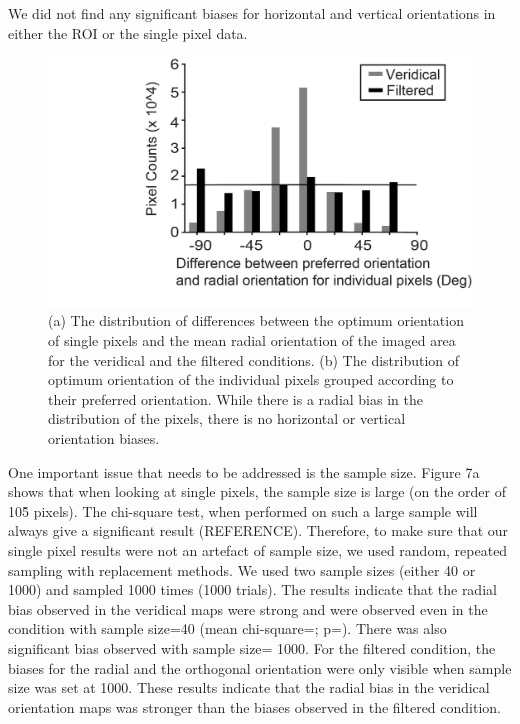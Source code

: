 			We did not find any significant biases for horizontal and vertical orientations in either the ROI or the single pixel data.
			
				\begin{figure}
					
					\includegraphics[width=\linewidth]{rb/singlepx_hist.jpg}
					\caption{(a) The distribution of differences between the optimum orientation of single pixels and the mean radial orientation of the imaged area for the veridical and the filtered conditions. (b) The distribution of optimum orientation of the individual pixels grouped according to their preferred orientation. While there is a radial bias in the distribution of the pixels, there is no horizontal or vertical orientation biases.}
					\label{fig:fig7}
				\end{figure}
			
			One important issue that needs to be addressed is the sample size. Figure 7a shows that when looking at single pixels, the sample size is large (on the order of 10\^5 pixels). The chi-square test, when performed on such a large sample will always give a significant result (REFERENCE). Therefore, to make sure that our single pixel results were not an artefact of sample size, we used random, repeated sampling with replacement methods. We used two sample sizes (either 40 or 1000) and sampled 1000 times (1000 trials). The results indicate that the radial bias observed in the veridical maps were strong and were observed even in the condition with sample size=40 (mean chi-square=; p=). There was also significant bias observed with sample size= 1000. For the filtered condition, the biases for the radial and the orthogonal orientation were only visible when sample size was set at 1000. These results indicate that the radial bias in the veridical orientation maps was stronger than the biases observed in the filtered condition. 
				
